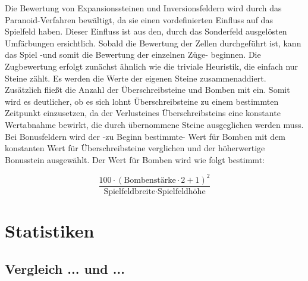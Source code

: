 \documentclass[12pt,a4paper]{article}
\begin{document}
Die Bewertung von Expansionssteinen und Inversionsfeldern wird durch das Paranoid-Verfahren bewältigt, da sie einen vordefinierten Einfluss auf das Spielfeld haben. Dieser Einfluss ist aus den, durch das Sonderfeld ausgelösten Umfärbungen ersichtlich.
\newpage
Sobald die Bewertung der Zellen durchgeführt ist, kann das Spiel -und somit die Bewertung der einzelnen Züge- beginnen. Die Zugbewertung erfolgt zunächst ähnlich wie die triviale Heuristik, die einfach nur Steine zählt. Es werden die Werte der eigenen Steine zusammenaddiert. Zusätzlich fließt die Anzahl der Überschreibsteine und Bomben mit ein. Somit wird es deutlicher, ob es sich lohnt Überschreibsteine zu einem bestimmten Zeitpunkt einzusetzen, da der \glqq Verlust\grqq eines Überschreibsteins eine konstante Wertabnahme bewirkt, die durch übernommene Steine ausgeglichen werden muss.
Bei Bonusfeldern wird der -zu Beginn bestimmte- Wert für Bomben mit dem konstanten Wert für Überschreibsteine verglichen und der höherwertige Bonusstein ausgewählt. Der Wert für Bomben wird wie folgt bestimmt:

\begin{equation*}
	\frac{100 \cdot (\text{Bombenstärke} \cdot 2 + 1)^2}{\text{Spielfeldbreite} \cdot \text{Spielfeldhöhe}}
\end{equation*}

\newpage
\section{Statistiken}

\subsection{Vergleich ... und ...}
\end{document}
